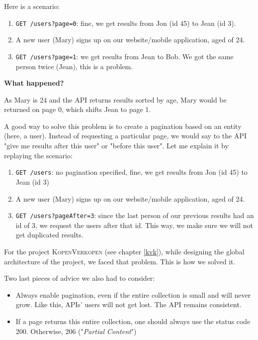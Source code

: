 \noindent Here is a scenario:

\begin{enumerate}
  \item \lstinline{GET /users?page=0}: fine, we get results from Jon (id 45) to Jean (id 3).
  \item A new user (Mary) signs up on our website/mobile application, aged of 24.
  \item \lstinline{GET /users?page=1}: we get results from Jean to Bob. We got the same person twice (Jean), this is a problem.
\end{enumerate}

\noindent \textbf{What happened?}

\bigskip

As Mary is 24 and the API returns results sorted by age, Mary would be returned on page 0, which shifts Jean to page 1.

\medskip

A good way to solve this problem is to create a pagination based on an entity (here, a user). Instead of requesting a particular page, we would say to the API "give me results after this user" or "before this user". Let me explain it by replaying the scenario:

\begin{enumerate}
  \item \lstinline{GET /users}: no pagination specified, fine, we get results from Jon (id 45) to Jean (id 3)
  \item A new user (Mary) signs up on our website/mobile application, aged of 24.
  \item \lstinline{GET /users?pageAfter=3}: since the last person of our previous results had an id of 3, we request the users after that id. This way, we make sure we will not get duplicated results.
\end{enumerate}

For the project \textsc{KopenVerkopen} (see  chapter \ref{kvk}), while designing the global architecture of the project, we faced that problem. This is how we solved it.

\medskip

Two last pieces of advice we also had to consider:

\begin{itemize}
  \item Always enable pagination, even if the entire collection is small and will never grow. Like this, APIs' users will not get lost. The API remains consistent.
  \item If a page returns this entire collection, one should always use the status code 200. Otherwise, 206 ("\textit{Partial Content}")
\end{itemize}

